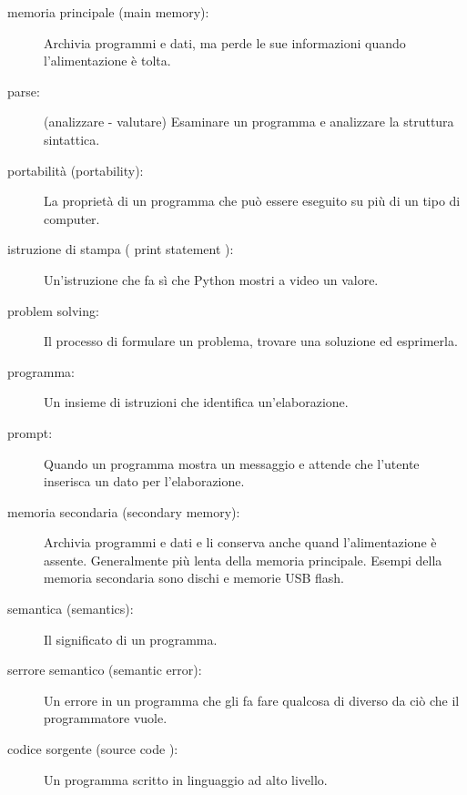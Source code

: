 \begin{description}
\item[memoria principale (main memory):] Archivia programmi e dati, ma perde le sue informazioni quando l'alimentazione \`{e} tolta.

\item[parse:]  (analizzare - valutare) Esaminare un programma e analizzare la struttura sintattica.

\item[portabilit\`{a} (portability):]  La propriet\`{a} di un programma che pu\`{o} essere eseguito su pi\`{u} di un tipo di computer.

\item[istruzione di stampa ( print statement ):]  Un'istruzione che fa s\`{i} che Python mostri a video un valore.

\item[problem solving:]  Il processo di formulare un problema, trovare una soluzione ed esprimerla.

\item[programma:] Un insieme di istruzioni che identifica un'elaborazione.

\item[prompt:] Quando un programma mostra un messaggio e attende che l'utente inserisca un dato per l'elaborazione.

\item[memoria secondaria (secondary memory):] Archivia programmi e dati e li conserva anche quand l'alimentazione \`{e} assente. Generalmente pi\`{u} lenta della memoria principale. Esempi della memoria secondaria sono dischi e memorie USB flash.

\item[semantica (semantics):]  Il significato di un programma.

\item[serrore semantico (semantic error):]   Un errore in un programma che gli fa fare qualcosa di diverso da ci\`{o} che il programmatore vuole.

\item[codice sorgente (source code ):]  Un programma scritto in linguaggio ad alto livello.


\end{description}


